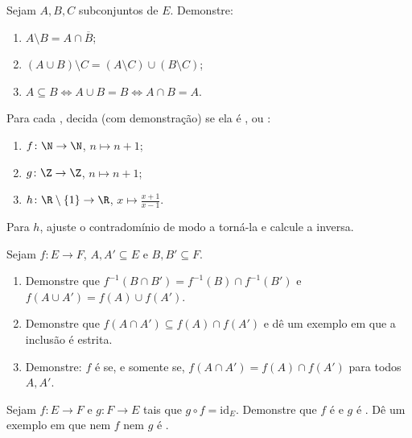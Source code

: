 \begin{exercise}[$\star$]\label{exo:b1:logic:6}
Sejam $A, B, C$ subconjuntos de $E$. Demonstre:
\begin{enumerate}
  \item $A \setminus B = A \cap \overline{B}$;
  \item $(A \cup B) \setminus C = (A \setminus C) \cup (B \setminus
        C)$;
  \item $A \subseteq B \iff A \cup B = B \iff A \cap B = A$.
\end{enumerate}
\end{exercise}

\begin{exercise}[$\star\star$]\label{exo:b1:logic:7}
Para cada , decida (com demonstração) se ela é ,
 ou :
\begin{enumerate}
  \item $f \colon \N \to \N$, $n \mapsto n + 1$;
  \item $g \colon \Z \to \Z$, $n \mapsto n + 1$;
  \item $h \colon \R \setminus \{1\} \to \R$, $x \mapsto
        \frac{x+1}{x-1}$.
\end{enumerate}
Para $h$, ajuste o contradomínio de modo a torná-la  e calcule a
inversa.
\end{exercise}

\begin{exercise}[$\star\star$]\label{exo:b1:logic:8}
Sejam $f \colon E \to F$, $A, A' \subseteq E$ e $B, B' \subseteq
F$.
\begin{enumerate}
  \item Demonstre que $f^{-1}(B \cap B') = f^{-1}(B) \cap f^{-1}(B')$ e
        $f(A \cup A') = f(A) \cup f(A')$.
  \item Demonstre que $f(A \cap A') \subseteq f(A) \cap f(A')$ e dê um
        exemplo em que a inclusão é estrita.
  \item Demonstre: $f$ é  se, e somente se, $f(A \cap A') = f(A)
        \cap f(A')$ para todos $A, A'$.
\end{enumerate}
\end{exercise}

\begin{exercise}[$\star\star$]\label{exo:b1:logic:9}
Sejam $f \colon E \to F$ e $g \colon F \to E$ tais que $g \circ f =
\mathrm{id}_E$. Demonstre que $f$ é  e $g$ é .
Dê um exemplo em que nem $f$ nem $g$ é .
\end{exercise}

